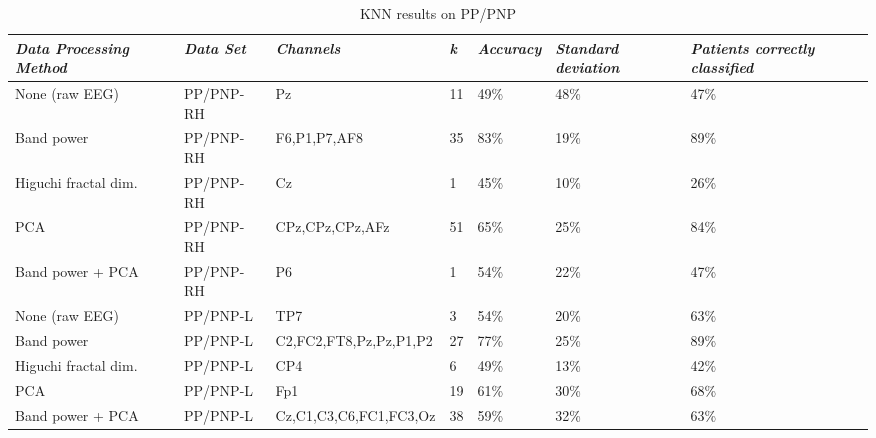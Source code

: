 \documentclass{mpaper}
\begin{document}
\begin{table}
\begin{tabular}{l|l|p{5cm}|l||l|p{1.5cm}|p{2cm}}
\hline
\emph{Data Processing Method} & \emph{Data Set} & \emph{Channels} & \emph{k} & \emph{Accuracy} & \emph{Standard deviation} & \emph{Patients correctly classified}  \\ \hline \hline
None (raw EEG) & PP/PNP-RH & Pz & 11 & 49\% & 48\% & 47\% \\ \hline
Band power & PP/PNP-RH & F6,P1,P7,AF8 & 35 & 83\% & 19\% & 89\% \\ \hline
Higuchi fractal dim. & PP/PNP-RH & Cz & 1 & 45\% & 10\% & 26\% \\ \hline
PCA & PP/PNP-RH & CPz,CPz,CPz,AFz & 51 & 65\% & 25\% & 84\% \\ \hline
Band power + PCA & PP/PNP-RH & P6 & 1 & 54\% & 22\% & 47\% \\ \hline

None (raw EEG) & PP/PNP-L & TP7 & 3 & 54\% & 20\% & 63\%\\ \hline
Band power & PP/PNP-L & C2,FC2,FT8,Pz,Pz,P1,P2 & 27 & 77\% & 25\% & 89\%\\ \hline
Higuchi fractal dim. & PP/PNP-L & CP4 & 6 & 49\% & 13\% & 42\%\\ \hline
PCA & PP/PNP-L & Fp1 & 19 & 61\% & 30\% & 68\%\\ \hline
Band power + PCA & PP/PNP-L & Cz,C1,C3,C6,FC1,FC3,Oz & 38 & 59\% & 32\% & 63\%\\ \hline

\end{tabular}
\caption{\label{results-knn}KNN results on PP/PNP}
\end{table}
\end{document}
